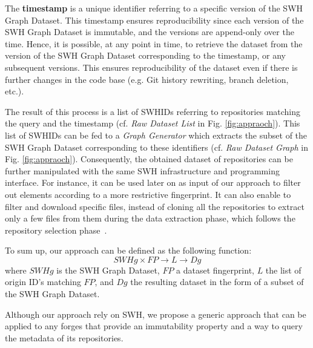 The \textbf{timestamp} is a unique identifier referring to a specific version of the SWH Graph Dataset. This timestamp ensures reproducibility since each version of the SWH Graph Dataset is immutable, and the versions are append-only over the time. Hence, it is possible, at any point in time, to retrieve the dataset from the version of the SWH Graph Dataset corresponding to the timestamp, or any subsequent versions. This ensures reproducibility of the dataset even if there is further changes in the code base (e.g. Git history rewriting, branch deletion, etc.). 

The result of this process is a list of SWHIDs referring to repositories matching the query and the timestamp (cf. \emph{Raw Dataset List} in Fig. \ref{fig:appraoch}).
This list of SWHIDs can be fed to a \emph{Graph Generator} which extracts the subset of the SWH Graph Dataset corresponding to these identifiers (cf. \emph{Raw Dataset Graph} in Fig. \ref{fig:appraoch}).
Consequently, the obtained dataset of repositories can be further manipulated with the same SWH infrastructure and programming interface.
For instance, it can be used later on as input of our approach to filter out elements according to a more restrictive fingerprint. 
It can also enable to filter and download specific files, instead of cloning all the repositories to extract only a few files from them during the data extraction phase, which follows the repository selection phase~\cite{vidoni2022systematic}.

To sum up, our approach can be defined as the following function:
\[ SWHg \times FP \rightarrow L \rightarrow Dg \]
where $SWHg$ is the SWH Graph Dataset, $FP$ a dataset fingerprint, $L$ the list of origin ID's matching $FP$, and  $Dg$ the resulting dataset in the form of a subset of the SWH Graph Dataset.

Although our approach rely on SWH, we propose a generic approach that can be applied to any forges that provide an immutability property and a way to query the metadata of its repositories.
